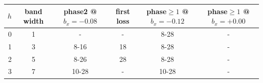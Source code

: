 \begin{tabular}{rccccc}
\toprule
$h$ & band width & phase2 @ $b_x=-0.08$ & first loss & phase$\ge1$ @ $b_x=-0.12$ & phase$\ge1$ @ $b_x=+0.00$ \\
\midrule
0 & 1 & - & - & 8-28 & - \\
1 & 3 & 8-16 & 18 & 8-28 & - \\
2 & 5 & 8-26 & 28 & 8-28 & - \\
3 & 7 & 10-28 & - & 10-28 & - \\
\bottomrule
\end{tabular}